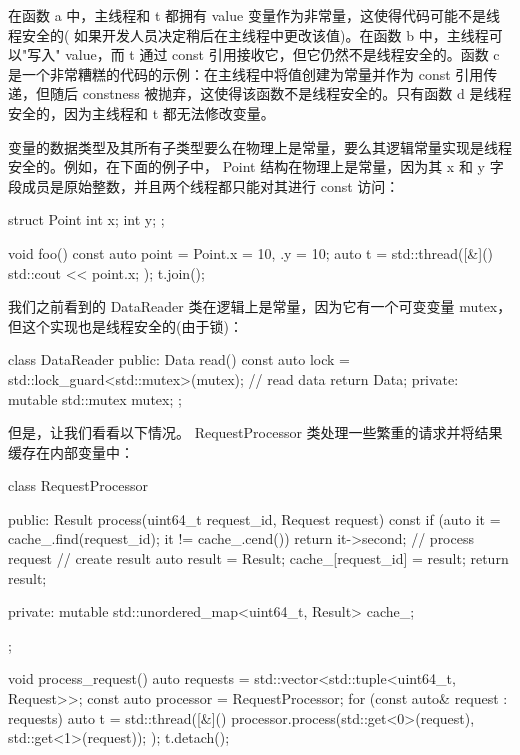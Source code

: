 在函数 a 中，主线程和 t 都拥有 value 变量作为非常量，这使得代码可能不是线程安全的( 如果开发人员决定稍后在主线程中更改该值)。在函数 b 中，主线程可以"写入" value，而 t 通过 const 引用接收它，但它仍然不是线程安全的。函数 c 是一个非常糟糕的代码的示例：在主线程中将值创建为常量并作为 const 引用传递，但随后 constness 被抛弃，这使得该函数不是线程安全的。只有函数 d 是线程安全的，因为主线程和 t 都无法修改变量。

变量的数据类型及其所有子类型要么在物理上是常量，要么其逻辑常量实现是线程安全的。例如，在下面的例子中， Point 结构在物理上是常量，因为其 x 和 y 字段成员是原始整数，并且两个线程都只能对其进行 const 访问：

\begin{cpp}
struct Point {
    int x;
    int y;
};

void foo() {
    const auto point = Point{.x = 10, .y = 10};
    auto t = std::thread([&]() { std::cout <<
        point.x; });
    t.join();
}
\end{cpp}

我们之前看到的 DataReader 类在逻辑上是常量，因为它有一个可变变量 mutex，但这个实现也是线程安全的(由于锁)：

\begin{cpp}
class DataReader {
public:
    Data read() const {
        auto lock = std::lock_guard<std::mutex>(mutex);
        // read data
        return Data{};
    }
private:
    mutable std::mutex mutex;
};
\end{cpp}

但是，让我们看看以下情况。 RequestProcessor 类处理一些繁重的请求并将结果缓存在内部变量中：

\begin{cpp}
class RequestProcessor {
public:
    Result process(uint64_t request_id,
    Request request) const {
        if (auto it = cache_.find(request_id); it !=
        cache_.cend()) {
            return it->second;
        }
        // process request
        // create result
        auto result = Result{};
        cache_[request_id] = result;
        return result;
    }

private:
    mutable std::unordered_map<uint64_t, Result> cache_;
};

void process_request() {
    auto requests = std::vector<std::tuple<uint64_t,
        Request>>{};
    const auto processor = RequestProcessor{};
    for (const auto& request : requests) {
        auto t = std::thread([&]() {
            processor.process(std::get<0>(request),
            std::get<1>(request));
        });
        t.detach();
    }
}
\end{cpp}

